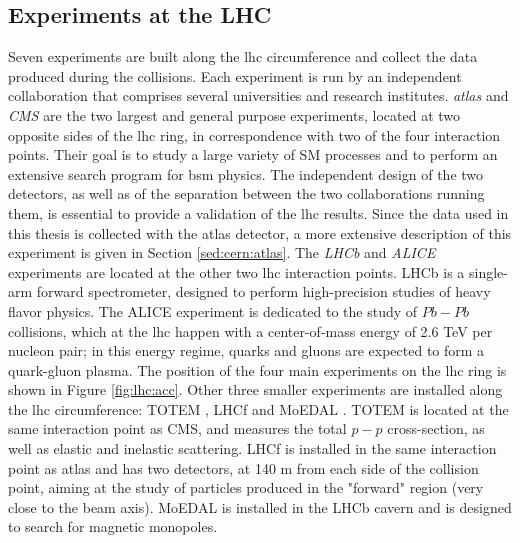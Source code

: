 \subsection{Experiments at the LHC}

Seven experiments are built along the \gls{lhc} circumference and collect the data produced during the collisions. Each experiment is run by an independent collaboration that comprises several universities and research institutes. 
\textit{\gls{atlas}} \cite{atlas:atlas} and \textit{CMS} \cite{cms:cms} are the two largest and general purpose experiments, located at two opposite sides of the \gls{lhc} ring, in correspondence with two of the four interaction points. Their goal is to study a large variety of SM processes and to perform an extensive search program for \gls{bsm} physics. The independent design of the two detectors, as well as of the separation between the two collaborations running them, is essential to provide a validation of the \gls{lhc} results. Since the data used in this thesis is collected with the \gls{atlas} detector, a more extensive description of this experiment is given in Section \ref{sed:cern:atlas}. 
The \textit{LHCb} \cite{lhcb:lhcb} and \textit{ALICE} \cite{alice:alice} experiments are located at the other two \gls{lhc} interaction points. LHCb is a single-arm forward spectrometer, designed to perform high-precision studies of heavy flavor physics. The ALICE experiment is dedicated to the study of $Pb-Pb$ collisions, which at the \gls{lhc} happen with a center-of-mass energy of 2.6 TeV per nucleon pair; in this energy regime, quarks and gluons are expected to form a quark-gluon plasma.
The position of the four main experiments on the \gls{lhc} ring is shown in Figure \ref{fig:lhc:acc}.
Other three smaller experiments are installed along the \gls{lhc} circumference: TOTEM \cite{totem:totem}, LHCf \cite{lhcf:lhcf} and MoEDAL \cite{moedal:moedal}. TOTEM is located at the same interaction point as CMS, and measures the total $p-p$ cross-section, as well as elastic and inelastic scattering. LHCf is installed in the same interaction point as \gls{atlas} and has two detectors, at 140 m from each side of the collision point, aiming at the study of particles produced in the "forward" region (very close to the beam axis). MoEDAL is installed in the LHCb cavern and is designed to search for magnetic monopoles.  





